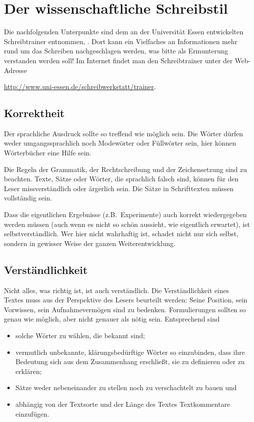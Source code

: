 \section {Der wissenschaftliche Schreibstil}
\label{a:stil}

Die nachfolgenden Unterpunkte sind dem an der Universität Essen
entwickelten Schreibtrainer entnommen, \cite{BuBiPo00}. Dort kann
ein Vielfaches an Informationen mehr rund um das Schreiben
nachgeschlagen werden, was bitte als Ermunterung verstanden werden
soll! Im Internet findet man den Schreibtrainer unter der
Web-Adresse

\begin{center}
\href{http://www.uni-essen.de/schreibwerkstatt/trainer}
{http://www.uni-essen.de/schreibwerkstatt/trainer}.
\end{center}


\subsection{Korrektheit}

Der sprachliche Ausdruck sollte so treffend wie möglich sein. Die
Wörter dürfen weder umgangssprachlich noch Modewörter oder
Füllwörter sein, hier können Wörterbücher eine Hilfe sein.

Die Regeln der Grammatik, der Rechtschreibung und der
Zeichensetzung sind zu beachten. Texte, Sätze oder Wörter, die
sprachlich falsch sind, können für den Leser missverständlich oder
ärgerlich sein. Die Sätze in Schrifttexten müssen vollständig
sein.

Dass die eigentlichen Ergebnisse (z.B.\ Experimente) auch korrekt
wiedergegeben werden müssen (auch wenn es nicht so schön aussieht,
wie eigentlich erwartet), ist selbstverständlich. Wer hier nicht
wahrhaftig ist, schadet nicht nur sich selbst, sondern in gewisser
Weise der ganzen Weiterentwicklung.


\subsection{Verständlichkeit}

Nicht alles, was richtig ist, ist auch  verständlich. Die
Verständlichkeit eines Textes muss aus der Perspektive des Lesers
beurteilt werden: Seine Position, sein Vorwissen, sein
Aufnahmevermögen sind zu bedenken. Formulierungen sollten so genau
wie möglich, aber nicht genauer als nötig sein. Entsprechend sind
\begin{itemize}
    \item solche Wörter zu wählen, die bekannt sind;
    \item vermutlich unbekannte, klärungsbedürftige Wörter so einzubinden,
        dass ihre Bedeutung sich aus dem Zusammenhang erschließt,
        sie zu definieren oder zu erklären;
    \item Sätze weder nebeneinander zu stellen noch zu verschachtelt zu bauen und
    \item abhängig von der Textsorte und der Länge des Textes Textkommentare einzufügen.
\end{itemize}


